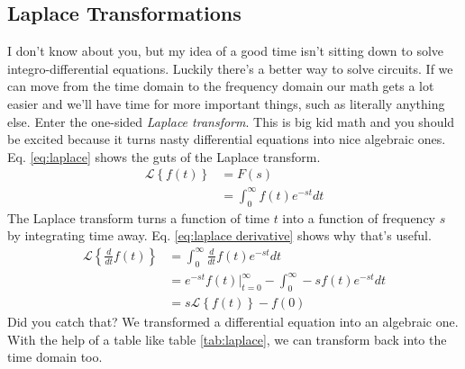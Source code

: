 \documentclass[nobib]{tufte-handout}
\begin{document}
\subsection{Laplace Transformations}

I don't know about you, but my idea of a 
good time isn't sitting down to solve 
integro-differential equations. Luckily
there's a better way to solve circuits. 
If we can move 
from the time domain to the frequency 
domain our math gets a lot easier 
and we'll have time for more important things,
such as literally anything else. 
Enter the one-sided \emph{Laplace transform}. 
This is big kid math and you should be excited
because it turns nasty differential equations 
into nice algebraic ones. Eq. \ref{eq:laplace} 
shows the guts of the Laplace transform. 
\begin{align} \label{eq:laplace}
    \mathcal{L}\left\{f(t)\right\} &= F(s) \\
    &= \int_{0}^{\infty} f(t)e^{-st}dt
\end{align}
The Laplace transform turns a function 
of time $t$ into a function of 
frequency $s$ by integrating time away. 
Eq. \ref{eq:laplace derivative} shows why that's useful. 
\begin{align} \label{eq:laplace derivative}
    \mathcal{L}\left\{\frac{d}{dt} f(t)\right\} &= \int_{0}^{\infty} \frac{d}{dt} f(t)e^{-st}dt \\
    &= e^{-st}f(t) \rvert_{t=0}^{\infty} - \int_{0}^{\infty} -s f(t)e^{-st}dt \\
    &= s \mathcal{L}\left\{f(t)\right\} - f(0)
\end{align}
Did you catch that? We transformed a 
differential equation into an algebraic one. 
With the help of a table like table \ref{tab:laplace}, we can transform 
back into the time domain too. 
\end{document}
